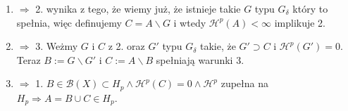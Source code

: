 \begin{enumerate}
    \item $\Longrightarrow$ 2. wynika z tego, że wiemy już, że istnieje takie $G$ typu $G_{\delta}$ który to spełnia, więc definujemy $C = A \backslash G$ i wtedy $\mathcal{H}^p(A) < \infty$ implikuje 2.
    \item $\Longrightarrow$ 3. Weżmy $G$ i $C$ z 2. oraz $G'$ typu $G_{\delta}$ takie, że $G' \supset C$ i $\mathcal{H}^p(G') = 0$. Teraz $B:=G \backslash G'$ i $C:= A \backslash B$ spełniają warunki 3.
    \item $\Longrightarrow$ 1. $B \in \mathcal{B}(X) \subset H_p \wedge \mathcal{H}^p(C) = 0 \wedge \mathcal{H}^p$ zupełna na $H_p \Longrightarrow A = B \cup C \in H_p$.
\end{enumerate}